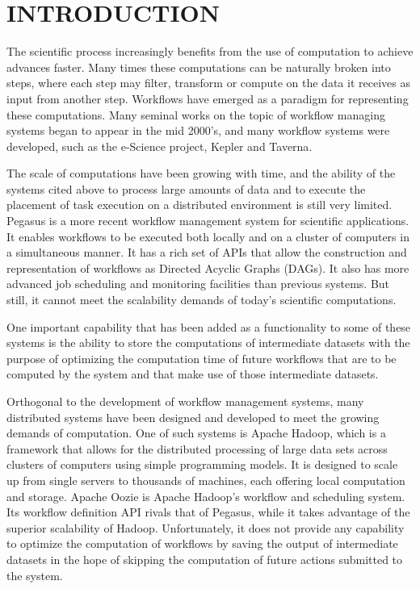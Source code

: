 \chapter{INTRODUCTION}
\label{chap:introduction}
The scientific process increasingly benefits from the use of computation to achieve advances faster. Many times these computations can be naturally broken into steps, where each step may filter, transform or compute on the data it receives as input from another step.  Workflows have emerged as a paradigm for representing these computations. Many seminal works on the topic of workflow managing systems began to appear in the mid 2000's\cite{yu2005taxonomy, fox2006special, gil2007examining}, and many workflow systems were developed, such as the e-Science project\cite{deelman2009workflows}, Kepler\cite{altintas2004kepler} and Taverna\cite{oinn2006taverna}.  

The scale of computations have been growing with time, and the ability of the systems cited above to process large amounts of data and to execute the placement of task execution on a distributed environment is still very limited.  Pegasus\cite{singh2008workflow} is a more recent workflow management system for scientific applications.  It enables workflows to be executed both locally and on a cluster of computers in a simultaneous manner.  It has a rich set of APIs that allow the construction and representation of workflows as Directed Acyclic Graphs (DAGs).  It also has more advanced job scheduling and monitoring facilities than previous systems.  But still, it cannot meet the scalability demands of today's scientific computations.  

One important capability that has been added as a functionality to some of these systems is the ability to store the computations of intermediate datasets with the purpose of optimizing the computation time of future workflows that are to be computed by the system and that make use of those intermediate datasets.

Orthogonal to the development of workflow management systems, many distributed systems have been designed and developed to meet the growing demands of computation.  One of such systems is Apache Hadoop, which is a framework that allows for the distributed processing of large data sets across clusters of computers using simple programming models. It is designed to scale up from single servers to thousands of machines, each offering local computation and storage. Apache Oozie\cite{islam2012oozie} is Apache Hadoop's workflow and scheduling system.  Its workflow definition API rivals that of Pegasus, while it takes advantage of the superior scalability of Hadoop. Unfortunately, it does not provide any capability to optimize the computation of workflows by saving the output of intermediate datasets in the hope of skipping the computation of future actions submitted to the system.

